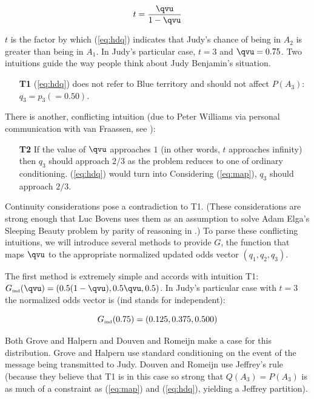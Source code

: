 \documentclass[phd,12pt,oneside]{ubcthesis}
\begin{document}
\begin{equation}
  \label{eq:aengaini}
  t=\frac{{\qvu}}{1-{\qvu}}
\end{equation}

\nial $t$ is the factor by which ({\ref{eq:hdq}}) indicates that
Judy's chance of being in $A_{2}$ is greater than being in $A_{1}$. In
Judy's particular case, $t=3$ and ${\qvu}=0.75$. Two intuitions guide
the way people think about Judy Benjamin's situation.

\begin{enumerate}
  \item[\textbf{T1}] ({\ref{eq:hdq}}) does not refer to Blue territory and
  should not affect $P(A_{3})$: $q_{3}=p_{3}(=0.50)$.
\end{enumerate}

\nial There is another, conflicting intuition (due to Peter Williams
via personal communication with van Fraassen, see
):

\begin{enumerate}
\item[\textbf{T2}] If the value of ${\qvu}$ approaches $1$ (in other words,
  $t$ approaches infinity) then $q_{3}$ should approach $2/3$ as the
  problem reduces to one of ordinary conditioning. ({\ref{eq:hdq}})
  would turn into  Considering
  ({\ref{eq:map}}), $q_{3}$ should approach $2/3$. 
\end{enumerate}

\nial Continuity considerations pose a contradiction to T1. (These
considerations are strong enough that Luc Bovens uses them as an
assumption to solve Adam Elga's Sleeping Beauty problem by parity of
reasoning in .) To parse these conflicting
intuitions, we will introduce several methods to provide $G$, the
function that maps ${\qvu}$ to the appropriate normalized updated odds
vector $(q_{1},q_{2},q_{3})$. 

The first method is extremely simple and accords with intuition T1:
$G_{\mbox{{\tiny ind}}}({\qvu})=(0.5(1-{\qvu}),0.5{\qvu},0.5)$. In
Judy's particular case with $t=3$ the normalized odds vector is (ind
stands for independent):

\begin{equation}
  \label{eq:shipodei}
  G_{\mbox{{\tiny ind}}}(0.75)=(0.125,0.375,0.500)
\end{equation}

\nial Both Grove and Halpern  and Douven
and Romeijn  make a case for this
distribution. Grove and Halpern use standard conditioning on the event
of the message being transmitted to Judy. Douven and Romeijn use
Jeffrey's rule (because they believe that T1 is in this case so strong
that $Q(A_{3})=P(A_{3})$ is as much of a constraint as (\ref{eq:map})
and (\ref{eq:hdq}), yielding a Jeffrey partition). 
\end{document}
